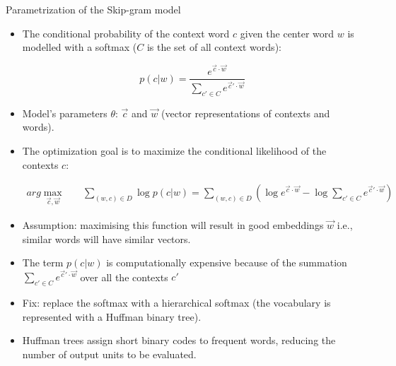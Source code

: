 
\begin{frame}{Parametrization of the Skip-gram model}
\begin{scriptsize}
\begin{itemize}
\item The conditional probability of the context word $c$ given the center word $w$ is modelled with a softmax ($C$ is the set of all context words):


\begin{displaymath}
p(c|w) = \frac{e^{\vec{c}\cdot \vec{w}}}{ \sum_{c'\in C} e^{\vec{c}'\cdot \vec{w}}}
\end{displaymath}



\item Model's parameters $\theta$: $\vec{c}$ and $\vec{w}$ (vector representations of contexts and words).
\item The optimization goal is to maximize the conditional likelihood of the contexts $c$:


\begin{equation}
\begin{split}
arg \max_{\vec{c}, \vec{w}} & \quad \sum_{(w,c) \in D}{\log p(c|w)} = \sum_{(w,c) \in D} ( \log e^{\vec{c}\cdot \vec{w}} - \log \sum_{c'\in C} e^{\vec{c}'\cdot \vec{w}}  )
\end{split}
\end{equation}


\item Assumption: maximising this function will result in good embeddings $\vec{w}$ i.e.,  similar words will have similar vectors.

\item The term $p(c|w)$ is computationally expensive because of the summation $\sum_{c'\in C} e^{\vec{c}'\cdot \vec{w}}$ over all the contexts $c'$

\item Fix: replace the softmax with a hierarchical softmax (the vocabulary is represented with a Huffman binary tree). 

\item Huffman trees assign short binary codes to frequent words, reducing the number of output units to be evaluated.

\end{itemize}
\end{scriptsize}
\end{frame}



